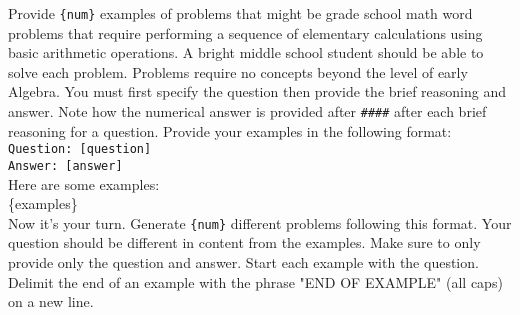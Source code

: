 \begin{tcolorbox}[colback=brown!5!white,colframe=brown!75!black,title=In One Prompt]
Provide \texttt{\{num\}} examples of problems that might be grade school math word problems that require performing a sequence of elementary calculations using basic arithmetic operations. A bright middle school student should be able to solve each problem. Problems require no concepts beyond the level of early Algebra. You must first specify the question then provide the brief reasoning and answer. Note how the numerical answer is provided after \texttt{\#\#\#\#} after each brief reasoning for a question. Provide your examples in the following format:\\

\texttt{Question: [question]} \\
\texttt{Answer: [answer]}\\

Here are some examples:\\

\{examples\}\\

Now it's your turn. Generate \texttt{\{num\}} different problems following this format. Your question should be different in content from the examples. Make sure to only provide only the question and answer. Start each example with the question. Delimit the end of an example with the phrase "END OF EXAMPLE" (all caps) on a new line.
\end{tcolorbox}
